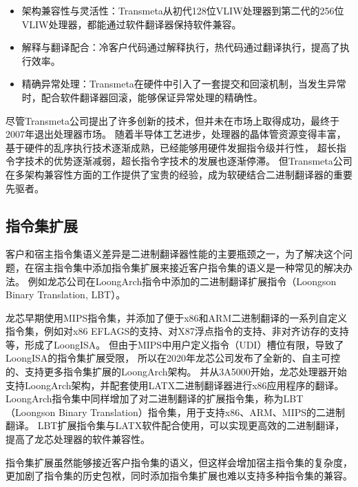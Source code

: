 \begin{itemize}
\item 架构兼容性与灵活性：Transmeta从初代128位VLIW处理器到第二代的256位VLIW处理器，都能通过软件翻译器保持软件兼容。
\item 解释与翻译配合：冷客户代码通过解释执行，热代码通过翻译执行，提高了执行效率。
\item 精确异常处理：Transmeta在硬件中引入了一套提交和回滚机制，当发生异常时，配合软件翻译器回滚，能够保证异常处理的精确性。
\end{itemize}

尽管Transmeta公司提出了许多创新的技术，但并未在市场上取得成功，最终于2007年退出处理器市场。
随着半导体工艺进步，处理器的晶体管资源变得丰富，基于硬件的乱序执行技术逐渐成熟，已经能够用硬件发掘指令级并行性，
超长指令字技术的优势逐渐减弱，超长指令字技术的发展也逐渐停滞。
但Transmeta公司在多架构兼容性方面的工作提供了宝贵的经验，成为软硬结合二进制翻译器的重要先驱者。

\subsection{指令集扩展}\label{sec:isa_extension}

客户和宿主指令集语义差异是二进制翻译器性能的主要瓶颈之一，为了解决这个问题，在宿主指令集中添加指令集扩展来接近客户指令集的语义是一种常见的解决办法。
例如龙芯公司在LoongArch指令中添加的二进制翻译扩展指令（Loongson Binary Translation, LBT）\cite{LoongArch2023}。

龙芯早期使用MIPS指令集，并添加了便于x86和ARM二进制翻译的一系列自定义指令集，例如对x86 EFLAGS的支持、对X87浮点指令的支持、非对齐访存的支持等，形成了LoongISA\cite{LoongISA}。
但由于MIPS中用户定义指令（UDI）槽位有限，导致了LoongISA的指令集扩展受限，
所以在2020年龙芯公司发布了全新的、自主可控的、支持更多指令集扩展的LoongArch架构\cite{LoongArch2023}。
并从3A5000开始，龙芯处理器开始支持LoongArch架构，并配套使用LATX二进制翻译器进行x86应用程序的翻译。
LoongArch指令集中同样增加了对二进制翻译的扩展指令集，称为LBT（Loongson Binary Translation）指令集，用于支持x86、ARM、MIPS的二进制翻译。
LBT扩展指令集与LATX软件配合使用，可以实现更高效的二进制翻译，提高了龙芯处理器的软件兼容性。

指令集扩展虽然能够接近客户指令集的语义，但这样会增加宿主指令集的复杂度，更加剧了指令集的历史包袱，同时添加指令集扩展也难以支持多种指令集的兼容。


